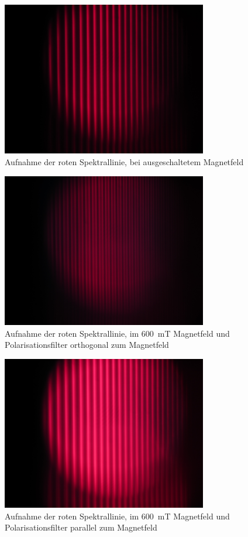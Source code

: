 \begin{figure}
	\centering
	\includegraphics[width=0.8\textwidth]{img/rot-0A.JPG}
	\caption{Aufnahme der roten Spektrallinie, bei ausgeschaltetem Magnetfeld}
	\label{fig:rot1}
\end{figure}
\begin{figure}
	\centering
	\includegraphics[width=0.8\textwidth]{img/rot-10A-ortho.JPG}
	\caption{Aufnahme der roten Spektrallinie, im \SI{600}{\milli \tesla} Magnetfeld und Polarisationsfilter orthogonal zum Magnetfeld}
	\label{fig:rot2}
\end{figure}
\begin{figure}
	\centering
	\includegraphics[width=0.8\textwidth]{img/rot-10A-parallel.JPG}
	\caption{Aufnahme der roten Spektrallinie, im \SI{600}{\milli \tesla} Magnetfeld und Polarisationsfilter parallel zum Magnetfeld}
	\label{fig:rot3}
\end{figure}

